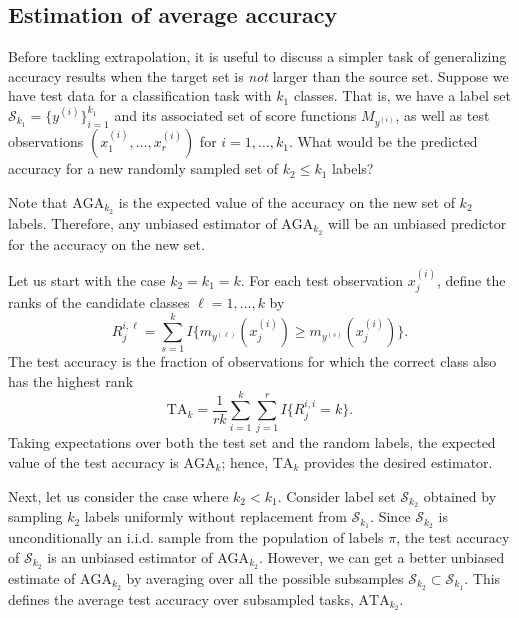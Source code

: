 \documentclass[twoside,11pt]{article}
\begin{document}
\subsection{Estimation of average accuracy}\label{sec:estimation_average_accuracy}
Before tackling extrapolation, it is useful to discuss a simpler task of generalizing accuracy results when the target set is \emph{not} larger than the source set. Suppose we have test data for a classification task with $k_1$
classes.  That is, we have a label set $\mathcal{S}_{k_1} =
\{y^{(i)}\}_{i=1}^{k_1}$ and its associated set of score functions
$M_{y^{(i)}}$, as well as test observations $(x_1^{(i)},\hdots,
x_{r}^{(i)})$ for $i = 1,\hdots, k_1$.  What would be the predicted
accuracy for a new randomly sampled set of $k_2 \leq k_1$ labels?

Note that $\text{AGA}_{k_2}$ is the expected value of the accuracy on
the new set of $k_2$ labels.  Therefore, any unbiased estimator of
$\text{AGA}_{k_2}$ will be an unbiased predictor for the accuracy on
the new set.

Let us start with the case $k_2 = k_1 = k$.  For each test observation
$x_j^{(i)}$, define the ranks of the candidate classes $\ell =
1,\hdots, k$ by
\[
R_{j}^{i, \ell} = \sum_{s = 1}^k I\{m_{y^{(\ell)}}(x_j^{(i)}) \geq m_{y^{(s)}}(x_j^{(i)})\}.
\]
The test accuracy is the fraction of observations for which the
correct class also has the highest rank
\begin{equation}\label{eq:test_risk}
\text{TA}_k = \frac{1}{r k} \sum_{i=1}^{k} \sum_{j=1}^{r} I\{R_j^{i,i} = k\}.
\end{equation}
Taking expectations over both the test set and the random labels, the
expected value of the test accuracy is $\text{AGA}_k$; hence,
$\text{TA}_k$ provides the desired estimator.

Next, let us consider the case where $k_2 < k_1$.  Consider label set
$\mathcal{S}_{k_2}$ obtained by sampling $k_2$ labels uniformly
without replacement from $\mathcal{S}_{k_1}$. Since
$\mathcal{S}_{k_2}$ is unconditionally an i.i.d. sample from the
population of labels $\pi$, the test accuracy of $\mathcal{S}_{k_2}$
is an unbiased estimator of $\text{AGA}_{k_2}$.  However, we can get a
better unbiased estimate of $\text{AGA}_{k_2}$ by averaging over all
the possible subsamples $\mathcal{S}_{k_2} \subset \mathcal{S}_{k_1}$.
This defines the average test accuracy over subsampled tasks,
$\text{ATA}_{k_2}$.
\end{document}
